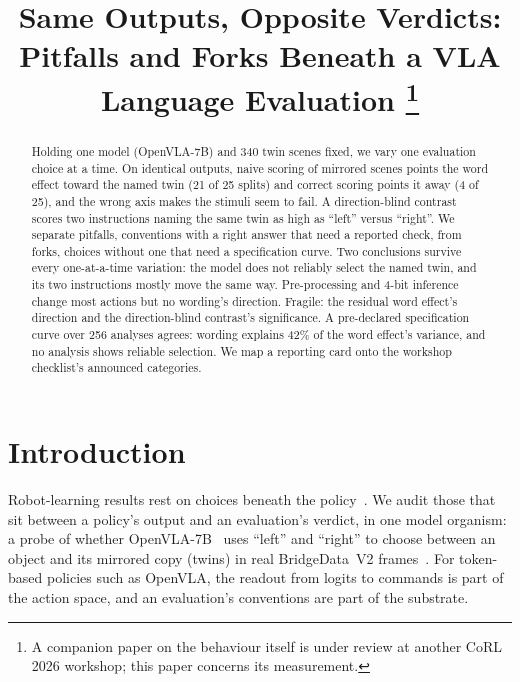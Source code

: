 \documentclass[conference]{IEEEtran}
\begin{document}
\title{Same Outputs, Opposite Verdicts: Pitfalls and Forks Beneath a VLA Language Evaluation%
\thanks{A companion paper on the behaviour itself is under review at another CoRL 2026 workshop; this paper concerns its measurement.}}
\author{}
\maketitle

\begin{abstract}
Holding one model (OpenVLA-7B) and 340 twin scenes fixed, we vary one evaluation choice at a time. On identical outputs, naive scoring of mirrored scenes points the word effect toward the named twin (21 of 25 splits) and correct scoring points it away (4 of 25), and the wrong axis makes the stimuli seem to fail. A direction-blind contrast scores two instructions naming the same twin as high as ``left'' versus ``right''. We separate pitfalls, conventions with a right answer that need a reported check, from forks, choices without one that need a specification curve. Two conclusions survive every one-at-a-time variation: the model does not reliably select the named twin, and its two instructions mostly move the same way. Pre-processing and 4-bit inference change most actions but no wording's direction. Fragile: the residual word effect's direction and the direction-blind contrast's significance. A pre-declared specification curve over 256 analyses agrees: wording explains 42\% of the word effect's variance, and no analysis shows reliable selection. We map a reporting card onto the workshop checklist's announced categories.
\end{abstract}

\section{Introduction}
\label{sec:intro}

Robot-learning results rest on choices beneath the policy~\cite{park2026everything}. We audit those that sit between a policy's output and an evaluation's verdict, in one model organism: a probe of whether OpenVLA-7B~\cite{kim2024openvla} uses ``left'' and ``right'' to choose between an object and its mirrored copy (twins) in real BridgeData~V2 frames~\cite{walke2023bridgedata}. For token-based policies such as OpenVLA, the readout from logits to commands is part of the action space, and an evaluation's conventions are part of the substrate.
\end{document}
